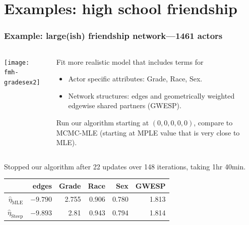 \documentclass[ 10pt]{beamer}
\newcommand{\etaMLE}{\hat{\eta}_{\textrm{MLE}}}
\begin{document}
\section{Examples: high school friendship}

\frame
{
  \frametitle{Example: large(ish) friendship network---1461 actors}  
\begin{columns}[t]
\begin{column}[T]{0.3\textwidth}
\texttt{[image: fmh-gradesex2]}
\end{column}

\begin{column}[T]{0.7\textwidth}
Fit more realistic model that includes terms for
\vspace{1mm}
\begin{itemize}
\item Actor specific attributes: Grade, Race, Sex.
\vspace{1mm}

\item Network structures: edges and geometrically weighted edgewise shared partners (GWESP).
\vspace{5mm}
\end{itemize}
\pause

Run our algorithm starting at $(0,0,0,0,0)$, compare to MCMC-MLE (starting at MPLE value that is very close to MLE).
\end{column}
\end{columns}
\vspace{5mm}

\pause
Stopped our algorithm after 22 updates over 148 iterations, taking 1hr 40min.
\begin{table}
\begin{center} 

\begin{tabular}{rrrrrr}
  \hline
 & edges & Grade & Race & Sex & GWESP \\ 
  \hline
$\etaMLE$ & $-9.790$ & 2.755 & 0.906 & 0.780 & 1.813 \\ 
$\hat{\eta}_{\textrm{Steep}}$ & 	$-9.893$	&	2.81	&	0.943	&	0.794	&	1.814\\ 
   \hline
\end{tabular}\label{T:FauxMagnolia}
\end{center}
\end{table}


}
\end{document}
